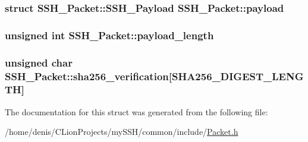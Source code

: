 \subsubsection[{\texorpdfstring{payload}{payload}}]{\setlength{\rightskip}{0pt plus 5cm}struct {\bf S\+S\+H\+\_\+\+Packet\+::\+S\+S\+H\+\_\+\+Payload}  S\+S\+H\+\_\+\+Packet\+::payload}\hypertarget{structSSH__Packet_a9a14fdf456e41d1e7b8ac7e98e2de83b}{}\label{structSSH__Packet_a9a14fdf456e41d1e7b8ac7e98e2de83b}
\subsubsection[{\texorpdfstring{payload\+\_\+length}{payload_length}}]{\setlength{\rightskip}{0pt plus 5cm}unsigned int S\+S\+H\+\_\+\+Packet\+::payload\+\_\+length}\hypertarget{structSSH__Packet_a53e4ab1ac5efa60989390c1966a7d3fb}{}\label{structSSH__Packet_a53e4ab1ac5efa60989390c1966a7d3fb}
\subsubsection[{\texorpdfstring{sha256\+\_\+verification}{sha256_verification}}]{\setlength{\rightskip}{0pt plus 5cm}unsigned char S\+S\+H\+\_\+\+Packet\+::sha256\+\_\+verification\mbox{[}S\+H\+A256\+\_\+\+D\+I\+G\+E\+S\+T\+\_\+\+L\+E\+N\+G\+TH\mbox{]}}\hypertarget{structSSH__Packet_a70c8dd74e6122753c751e92b5b697caf}{}\label{structSSH__Packet_a70c8dd74e6122753c751e92b5b697caf}


The documentation for this struct was generated from the following file\+:\begin{DoxyCompactItemize}
\item 
/home/denis/\+C\+Lion\+Projects/my\+S\+S\+H/common/include/\hyperlink{Packet_8h}{Packet.\+h}\end{DoxyCompactItemize}
